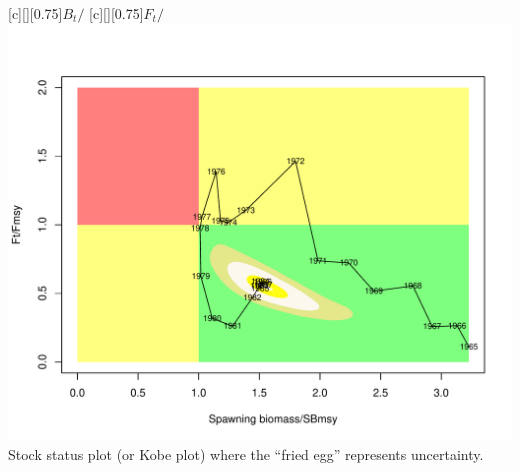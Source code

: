 \begin{multicols}{2}
\begin{figurehere}
	\centering
	[][0.75]{$B_t/$\bmsy}
	[][0.75]{$F_t/$\fmsy}
	\includegraphics[width=\columnwidth]{iscamFigs/NhakeKobeplot.pdf}\\
	\caption{Stock status plot (or Kobe plot) where the ``fried egg'' represents uncertainty.}\label{fig7}
\end{figurehere}

\end{multicols}



